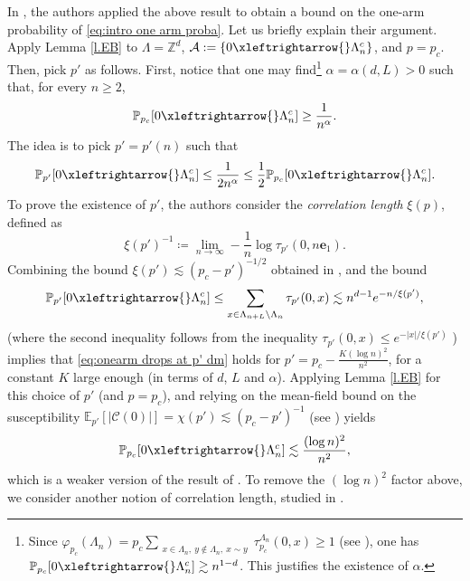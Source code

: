 \documentclass[11pt,a4paper]{article}
\numberwithin{equation}{section}
\theoremstyle{plain}
\theoremstyle{definition}
\newcommand{\connect}{\xleftrightarrow}
\newcommand{\1}{\mathbf 1}
\begin{document}
In \cite{DewanMuirhead}, the authors applied the above result to obtain a bound on the one-arm probability of \eqref{eq:intro one arm proba}. Let us briefly explain their argument. Apply Lemma \ref{l.EB} to $\Lambda=\mathbb Z^d$, $\mathcal A:=\{0\connect{} \Lambda_n^c\}$, and $p=p_c$. Then, pick $p'$ as follows. First, notice that one may find\footnote{Since $\varphi_{p_c}(\Lambda_n)=p_c\sum_{\substack{x\in \Lambda_n, \:y\notin \Lambda_n, \:x\sim y}}\tau^{\Lambda_n}_{p_c}(0,x)\geq 1$ (see \cite{DuminilTassionNewProofSharpness2016}), one has $\mathbb P_{p_c}[0\connect{} \Lambda_n^c]\gtrsim n^{1-d}$. This justifies the existence of $\alpha$. } $\alpha=\alpha(d,L)>0$ such that, for every $n\geq 2$,
\begin{equation}
	\mathbb P_{p_c}[0\connect{}\Lambda_n^c]\geq \frac{1}{n^\alpha}.
\end{equation}
The idea is to pick $p'=p'(n)$ such that
\begin{equation}\label{eq:onearm drops at p' dm}
	\mathbb P_{p'}[0\connect{}\Lambda_n^c]\leq \frac{1}{2 n^\alpha}\leq \frac{1}{2}\mathbb P_{p_c}[0\connect{}\Lambda_n^c].
\end{equation}
To prove the existence of $p'$, the authors consider the \emph{correlation length} $\xi(p)$, defined as
	\begin{equation}
		\xi(p')^{-1}\coloneqq \lim_{n\to\infty} -\frac{1}{n}\log \tau_{p'}(0, n \mathbf{e}_1).
	\end{equation}
Combining the bound $\xi(p')\lesssim (p_c-p')^{-1/2}$ obtained in \cite{hara1990mean,HaraSlade1990Perco}, and the bound
\begin{equation}
	\mathbb P_{p'}[0\connect{} \Lambda_n^c]\leq \sum_{x\in  \Lambda_{n+L}\setminus \Lambda_{n}}\tau_{p'}(0,x)\lesssim n^{d-1}e^{-n/\xi(p')},
\end{equation}
(where the second inequality follows from the inequality $\tau_{p'}(0,x)\leq e^{-|x|/\xi(p')}$ \cite[Chapter~6.2]{GrimmettPercolation1999}) implies that \eqref{eq:onearm drops at p' dm} holds for $p'=p_c-\frac{K(\log n)^2}{n^2}$, for a constant $K$ large enough (in terms of $d$, $L$ and $\alpha$). Applying Lemma \ref{l.EB} for this choice of $p'$ (and $p=p_c$), and relying on the mean-field bound on the susceptibility $\mathbb E_{p'}[|\mathcal C(0)|]=\chi(p')\lesssim (p_c-p')^{-1}$ (see \cite{AizenmanNewmanTreeGraphInequalities1984}) yields
\begin{equation}
	\mathbb P_{p_c}[0\connect{}\Lambda_n^c]\lesssim \frac{(\log n)^2}{n^2},
\end{equation}
which is a weaker version of the result of \cite{KozmaNachmias}. To remove the $(\log n)^2$ factor above, we consider another notion of correlation length, studied in \cite{DumPan24Perco}.
\end{document}
